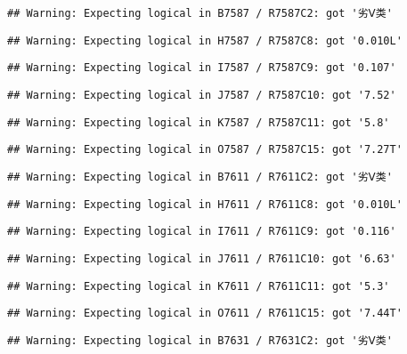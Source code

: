 \documentclass[
]{article}
\begin{document}
\begin{verbatim}
## Warning: Expecting logical in B7587 / R7587C2: got '劣Ⅴ类'
\end{verbatim}

\begin{verbatim}
## Warning: Expecting logical in H7587 / R7587C8: got '0.010L'
\end{verbatim}

\begin{verbatim}
## Warning: Expecting logical in I7587 / R7587C9: got '0.107'
\end{verbatim}

\begin{verbatim}
## Warning: Expecting logical in J7587 / R7587C10: got '7.52'
\end{verbatim}

\begin{verbatim}
## Warning: Expecting logical in K7587 / R7587C11: got '5.8'
\end{verbatim}

\begin{verbatim}
## Warning: Expecting logical in O7587 / R7587C15: got '7.27T'
\end{verbatim}

\begin{verbatim}
## Warning: Expecting logical in B7611 / R7611C2: got '劣Ⅴ类'
\end{verbatim}

\begin{verbatim}
## Warning: Expecting logical in H7611 / R7611C8: got '0.010L'
\end{verbatim}

\begin{verbatim}
## Warning: Expecting logical in I7611 / R7611C9: got '0.116'
\end{verbatim}

\begin{verbatim}
## Warning: Expecting logical in J7611 / R7611C10: got '6.63'
\end{verbatim}

\begin{verbatim}
## Warning: Expecting logical in K7611 / R7611C11: got '5.3'
\end{verbatim}

\begin{verbatim}
## Warning: Expecting logical in O7611 / R7611C15: got '7.44T'
\end{verbatim}

\begin{verbatim}
## Warning: Expecting logical in B7631 / R7631C2: got '劣Ⅴ类'
\end{verbatim}
\end{document}
